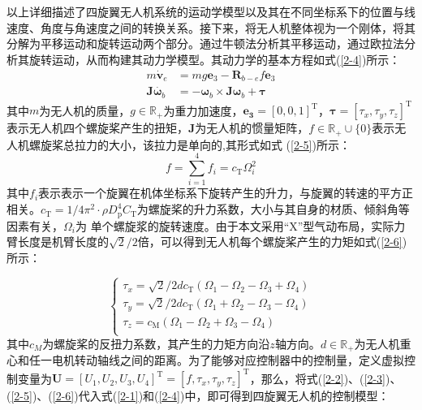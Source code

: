 \documentclass[lang=chs, degree=master, blindreview=false, winfonts=true]{yanputhesis}
\begin{document}
以上详细描述了四旋翼无人机系统的运动学模型以及其在不同坐标系下的位置与线速度、角度与角速度之间的转换关系。接下来，将无人机整体视为一个刚体，将其分解为平移运动和旋转运动两个部分。通过牛顿法分析其平移运动，通过欧拉法分析其旋转运动，从而构建其动力学模型。其动力学的基本方程如式(\ref{2-4})所示：
\begin{equation}
	\begin{aligned}
		m\dot{\boldsymbol{v}}_e&=mg\bm{e}_{3}-\boldsymbol{R}_{b-e}f\bm{e}_{3}\\
		\boldsymbol{J}\dot{\boldsymbol{\omega}_b}&=-\bm \omega_b \times \bm J \bm \omega_b+\boldsymbol{\tau}
	\end{aligned}\label{2-4}
\end{equation}
其中$m$为无人机的质量，$g\in\mathbb{R}_+$为重力加速度，$\bm{e_{3}}=\left[0,0,1\right]^\mathrm{T}$，$\boldsymbol{\tau}=\left[\tau_x,\tau_y,\tau_z\right]^\mathrm{T}$表示无人机四个螺旋桨产生的扭矩，$\boldsymbol{J}$为无人机的惯量矩阵，$f\in\mathbb{R}_+\cup\{0\}$表示无人机螺旋桨总拉力的大小，该拉力是单向的,其形式如式 (\ref{2-5})所示：
\begin{equation}
	f=\sum_{i=1}^4f_i=c_\mathrm{T}\Omega_i^2
	\label{2-5}
\end{equation}
其中$f_i$表示表示一个旋翼在机体坐标系下旋转产生的升力，与旋翼的转速的平方正相关。$c_\mathrm{T}=1/4\pi^2\cdot\rho D_\mathrm{p}^4C_\mathrm{T}$为螺旋桨的升力系数，大小与其自身的材质、倾斜角等因素有关，$\Omega_i$为
单个螺旋浆的旋转速度。由于本文采用“X”型气动布局，实际力臂长度是机臂长度的$\sqrt{2}/2$倍，可以得到无人机每个螺旋桨产生的力矩如式(\ref{2-6})所示：


\begin{equation}
	\left\{ \begin{array}{l}
		\tau_x={\sqrt{2}}/{2}dc_\mathrm{T}\left(\Omega_1-\Omega_2-\Omega_3+\Omega_4\right)\\
		\tau_y={\sqrt{2}}/{2}dc_\mathrm{T}\left(\Omega_1+\Omega_2-\Omega_3-\Omega_4\right)\\
		\tau_z=c_\mathrm{M}\left(\Omega_1-\Omega_2+\Omega_3-\Omega_4\right)\\
	\end{array} \right.
		\label{2-6}
\end{equation}
其中$c_M$为螺旋桨的反扭力系数，其产生的力矩方向沿$z$轴方向。$d\in\mathbb{R}_+$为无人机重心和任一电机转动轴线之间的距离。为了能够对应控制器中的控制量，定义虚拟控制变量为$\bm{U}=\left[U_1,U_2,U_3,U_4\right]^\mathrm{T}=\left[f,\tau_x,\tau_y,\tau_z\right]^\mathrm{T}$，那么，将式(\ref{2-2})、(\ref{2-3})、(\ref{2-5})、(\ref{2-6})代入式(\ref{2-1})和(\ref{2-4})中，即可得到四旋翼无人机的控制模型：
\end{document}
